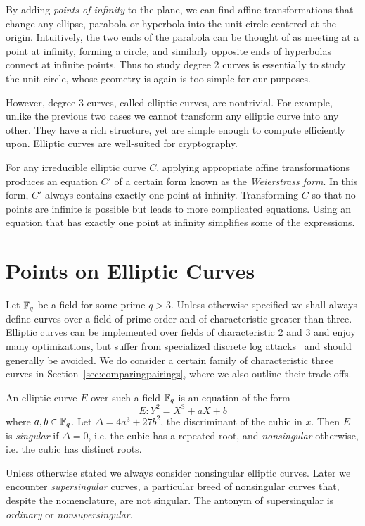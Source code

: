 By adding \emph{points of infinity} to the plane, we can find affine
transformations that change any ellipse, parabola or hyperbola into the unit
circle centered at the origin. Intuitively, the two ends of the parabola can be
thought of as meeting at a point at infinity, forming a circle, and similarly
opposite ends of hyperbolas connect at infinite points. Thus to study degree 2
curves is essentially to study the unit circle, whose geometry is again is too
simple for our purposes.

However, degree 3 curves, called elliptic curves, are nontrivial. For example,
unlike the previous two cases we cannot transform any elliptic curve into any
other. They have a rich structure, yet are simple enough to compute efficiently
upon. Elliptic curves are well-suited for cryptography.

For any irreducible elliptic curve $C$, applying appropriate affine
transformations produces an equation $C'$ of a certain form known as the
\emph{Weierstrass form}. In this form, $C'$ always contains exactly one point
at infinity. Transforming $C$ so that no points are infinite is possible but
leads to more complicated equations. Using an equation that has exactly one
point at infinity simplifies some of the expressions.

\section {Points on Elliptic Curves}

Let $\mathbb{F}_q$ be a field for some prime $q > 3$. Unless otherwise specified we
shall always define curves over a field of prime order and of characteristic
greater than three. Elliptic curves can be implemented over fields of
characteristic 2 and 3 and enjoy many optimizations, but suffer from
specialized discrete log attacks~\cite{coppersmith} and should generally be
avoided. We do consider a certain family of characteristic three curves in
Section~\ref{sec:comparingpairings}, where we also outline their trade-offs.

An elliptic curve $E$ over such a field $\mathbb{F}_q$ is an equation of the form
\[ E: Y^2 = X^3 + a X + b \]
where $a, b \in \mathbb{F}_q$. Let $\Delta = 4 a^3 + 27b^2$, the discriminant of the
cubic in $x$. Then $E$ is \emph{singular} if $\Delta = 0$, i.e. the cubic has a
repeated root, and \emph{nonsingular} otherwise, i.e. the cubic has distinct
roots.

Unless otherwise stated we always consider nonsingular elliptic curves. Later
we encounter \emph{supersingular} curves, a particular breed of nonsingular
curves that, despite the nomenclature, are not singular. The antonym of
supersingular is \emph{ordinary} or \emph{nonsupersingular}.

